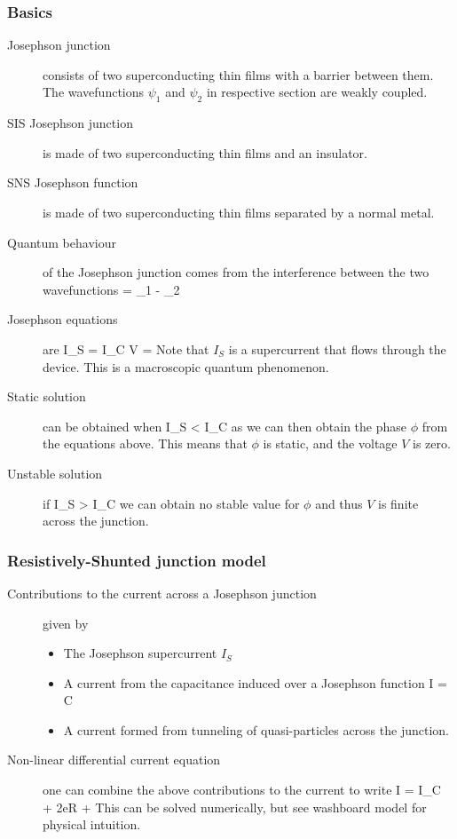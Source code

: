 \subsubsection{Basics}
\begin{description}
\item[Josephson junction] consists of two superconducting thin films with a barrier between them. The wavefunctions $\psi_1$ and $\psi_2$ in respective section are weakly coupled. 

\item[SIS Josephson junction] is made of two superconducting thin films and an insulator. 

\item[SNS Josephson function] is made of two superconducting thin films separated by a normal metal. 


\item[Quantum behaviour] of the Josephson junction comes from the interference between the two wavefunctions
\beq
\phi = \phi_1 - \phi_2
\eeq

\item[Josephson equations] are
\beq
I_S = I_C \sin{\phi}
\eeq
\beq
V =  
\eeq
Note that $I_S$ is a supercurrent that flows through the device. This is a macroscopic quantum phenomenon. 


\item[Static solution] can be obtained when
\beq
I_S < I_C
\eeq
as we can then obtain the phase $\phi$ from the equations above. This means that $\phi$ is static, and the voltage $V$ is zero. 

\item[Unstable solution] if
\beq
I_S > I_C
\eeq
we can obtain no stable value for $\phi$ and thus $V$ is finite across the junction. 

\end{description}
\subsubsection{Resistively-Shunted junction model}

\begin{description}
\item[Contributions to the current across a Josephson junction] given by
\begin{itemize}
\item The Josephson supercurrent $I_S$ 
\item A current from the capacitance induced over a Josephson function 
\beq
I = C
\eeq
\item A current formed from tunneling of quasi-particles across the junction. 
\end{itemize}

\item[Non-linear differential current equation] one can combine the above contributions to the current to write
\beq
I = I_C \sin{\phi} + \frac{\hbar} {2eR}  +  
\eeq
This can be solved numerically, but see washboard model for physical intuition. 

\end{description}
